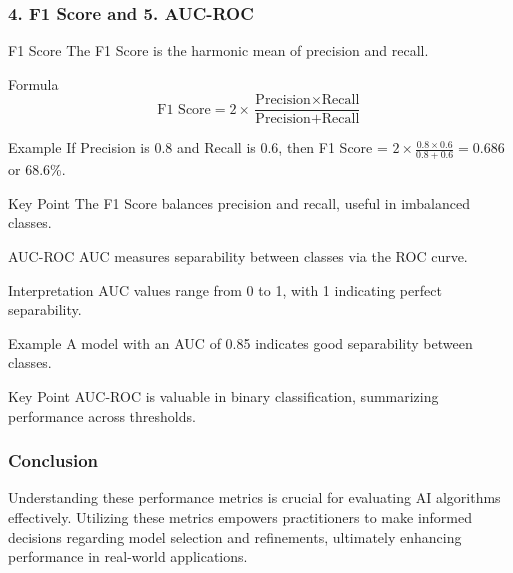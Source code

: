 \documentclass[aspectratio=169]{beamer}
\begin{document}
\begin{frame}[fragile]
    \frametitle{4. F1 Score and 5. AUC-ROC}
    \begin{block}{F1 Score}
        The F1 Score is the harmonic mean of precision and recall.
    \end{block}

    \begin{block}{Formula}
        \begin{equation}
        \text{F1 Score} = 2 \times \frac{\text{Precision} \times \text{Recall}}{\text{Precision} + \text{Recall}}
        \end{equation}
    \end{block}

    \begin{block}{Example}
        If Precision is 0.8 and Recall is 0.6, then F1 Score = \( 2 \times \frac{0.8 \times 0.6}{0.8 + 0.6} = 0.686 \) or 68.6\%.
    \end{block}
    
    \begin{block}{Key Point}
        The F1 Score balances precision and recall, useful in imbalanced classes.
    \end{block}

    \begin{block}{AUC-ROC}
        AUC measures separability between classes via the ROC curve.
    \end{block}

    \begin{block}{Interpretation}
        AUC values range from 0 to 1, with 1 indicating perfect separability.
    \end{block}

    \begin{block}{Example}
        A model with an AUC of 0.85 indicates good separability between classes.
    \end{block}
    
    \begin{block}{Key Point}
        AUC-ROC is valuable in binary classification, summarizing performance across thresholds.
    \end{block}
\end{frame}

\begin{frame}[fragile]
    \frametitle{Conclusion}
    Understanding these performance metrics is crucial for evaluating AI algorithms effectively. 
    Utilizing these metrics empowers practitioners to make informed decisions regarding model selection and refinements, ultimately enhancing performance in real-world applications.
\end{frame}
\end{document}
